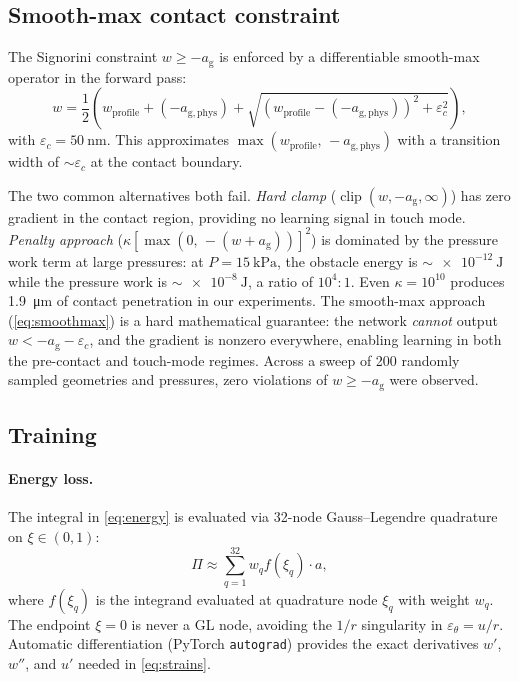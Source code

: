\documentclass[review,12pt]{elsarticle}
\begin{document}
\subsection{Smooth-max contact constraint}
\label{sec:contact}

The Signorini constraint $w \ge -a_\mathrm{g}$ is enforced by a
differentiable smooth-max operator in the forward pass:
\begin{equation}
    w = \frac{1}{2}\!\left(
        w_\mathrm{profile} + (-a_\mathrm{g,phys})
        + \sqrt{(w_\mathrm{profile} - (-a_\mathrm{g,phys}))^2 + \varepsilon_c^2}
    \right),
    \label{eq:smoothmax}
\end{equation}
with $\varepsilon_c = \SI{50}{\nano\metre}$. This approximates
$\max(w_\mathrm{profile},\,-a_\mathrm{g,phys})$ with a transition width of
$\sim\varepsilon_c$ at the contact boundary.

The two common alternatives both fail. \emph{Hard clamp}
($\operatorname{clip}(w, -a_\mathrm{g}, \infty)$) has zero gradient in the
contact region, providing no learning signal in touch mode. \emph{Penalty
approach} ($\kappa[\max(0,\,-(w+a_\mathrm{g}))]^2$) is dominated by the
pressure work term at large pressures: at $P = \SI{15}{\kilo\pascal}$, the
obstacle energy is $\sim\SI{e-12}{\joule}$ while the pressure work is
$\sim\SI{e-8}{\joule}$, a ratio of $10^4:1$. Even $\kappa = 10^{10}$ produces
\SI{1.9}{\micro\metre} of contact penetration in our experiments. The
smooth-max approach (\cref{eq:smoothmax}) is a hard mathematical guarantee:
the network \emph{cannot} output $w < -a_\mathrm{g} - \varepsilon_c$,
and the gradient is nonzero everywhere, enabling learning in both the
pre-contact and touch-mode regimes. Across a sweep of 200 randomly sampled
geometries and pressures, zero violations of $w \ge -a_\mathrm{g}$ were
observed.

\subsection{Training}
\label{sec:training}

\paragraph{Energy loss.}
The integral in \cref{eq:energy} is evaluated via 32-node Gauss–Legendre
quadrature on $\xi\in(0,1)$:
\begin{equation}
    \Pi \approx \sum_{q=1}^{32} w_q f(\xi_q) \cdot a,
    \label{eq:quadrature}
\end{equation}
where $f(\xi_q)$ is the integrand evaluated at quadrature node $\xi_q$ with
weight $w_q$. The endpoint $\xi=0$ is never a GL node, avoiding the
$1/r$ singularity in $\varepsilon_\theta = u/r$.  Automatic differentiation
(PyTorch \texttt{autograd}) provides the exact derivatives $w'$, $w''$, and
$u'$ needed in \cref{eq:strains}.
\end{document}
